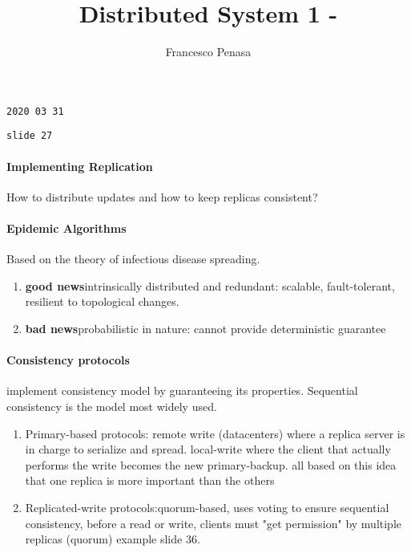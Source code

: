 \documentclass[11pt]{article}
\begin{document}
\author{Francesco Penasa}
\title{Distributed System 1 - }
\maketitle

\medskip

\texttt{2020 03 31}

\texttt{slide 27}
\paragraph{Implementing Replication} %
\label{par:implementing_replication}
How to distribute updates and how to keep replicas consistent?
\paragraph{Epidemic Algorithms} %
\label{par:epidemic_algorithms}
Based on the theory of infectious disease spreading.
\begin{enumerate}
	\item \textbf{good news}intrinsically distributed and redundant: scalable, fault-tolerant, resilient to topological changes.
	\item \textbf{bad news}probabilistic in nature: cannot provide deterministic guarantee 
\end{enumerate}

\paragraph{Consistency protocols} %
\label{par:consistency_protocols}
implement consistency model by guaranteeing its properties. Sequential consistency is the model most widely used. 
\begin{enumerate}
	\item Primary-based protocols: remote write (datacenters) where a replica server is in charge to serialize and spread. local-write where the client that actually performs the write becomes the new primary-backup. all based on this idea that one replica is more important than the others
	\item Replicated-write protocols:quorum-based, uses voting to ensure sequential consistency, before a read or write, clients must "get permission" by multiple replicas (quorum) example slide 36.
\end{enumerate}
\end{document}
